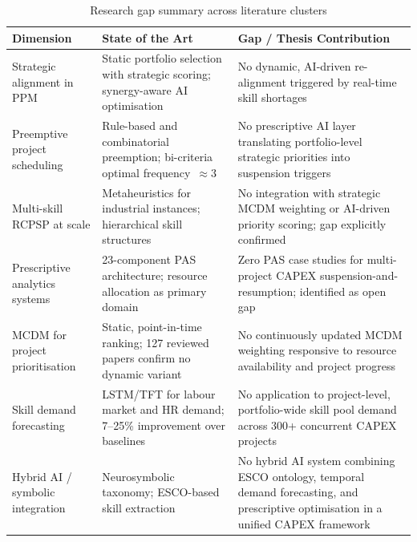\begin{table}[htbp]
  \centering
  \caption{Research gap summary across literature clusters}
  \label{tab:gap}
  \small
  \begin{tabular}{@{}p{3.8cm}p{5.8cm}p{4.2cm}@{}}
    \toprule
    \textbf{Dimension} & \textbf{State of the Art} & \textbf{Gap / Thesis Contribution} \\
    \midrule
    Strategic alignment in PPM &
    Static portfolio selection with strategic scoring; synergy-aware AI optimisation
    \parencite{chiang2013strategic, rodriguezgarcia2025ai} &
    No dynamic, AI-driven re-alignment triggered by real-time skill shortages \\[0.4em]

    Preemptive project scheduling &
    Rule-based and combinatorial preemption; bi-criteria optimal frequency~$\approx 3$
    \parencite{hatamimoghaddam2024robust, vanhoucke2025impact} &
    No prescriptive AI layer translating portfolio-level strategic priorities into
    suspension triggers \\[0.4em]

    Multi-skill RCPSP at scale &
    Metaheuristics for industrial instances; hierarchical skill structures
    \parencite{torba2024reallife, snauwaert2025hierarchical} &
    No integration with strategic MCDM weighting or AI-driven priority scoring;
    gap explicitly confirmed \parencite{artigues2025fifty, hartmann2022updated} \\[0.4em]

    Prescriptive analytics systems &
    23-component PAS architecture; resource allocation as primary domain
    \parencite{lepenioti2020prescriptive, wissuchek2025prescriptive} &
    Zero PAS case studies for multi-project CAPEX suspension-and-resumption;
    identified as open gap \parencite{wissuchek2025prescriptive} \\[0.4em]

    MCDM for project prioritisation &
    Static, point-in-time ranking; 127 reviewed papers confirm no dynamic variant
    \parencite{kandakoglu2024mcdm, chatterjee2018fuzzy} &
    No continuously updated MCDM weighting responsive to resource availability
    and project progress \\[0.4em]

    Skill demand forecasting &
    LSTM/TFT for labour market and HR demand; 7--25\% improvement over baselines
    \parencite{macedo2022skills, lim2021tft} &
    No application to project-level, portfolio-wide skill pool demand across
    300+ concurrent CAPEX projects \\[0.4em]

    Hybrid AI / symbolic integration &
    Neurosymbolic taxonomy; ESCO-based skill extraction
    \parencite{garcez2022neurosymbolic, gartner2024hype} &
    No hybrid AI system combining ESCO ontology, temporal demand forecasting,
    and prescriptive optimisation in a unified CAPEX framework \\
    \bottomrule
  \end{tabular}
\end{table}

